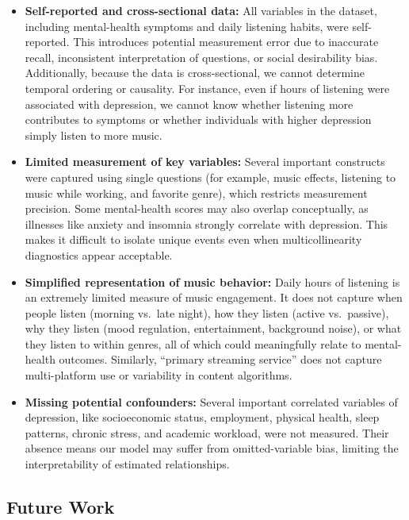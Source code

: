 \documentclass[
  letterpaper,
  DIV=11,
  numbers=noendperiod]{scrartcl}
\begin{document}
\begin{itemize}
\item
  \textbf{Self-reported and cross-sectional data:} All variables in the
  dataset, including mental-health symptoms and daily listening habits,
  were self-reported. This introduces potential measurement error due to
  inaccurate recall, inconsistent interpretation of questions, or social
  desirability bias. Additionally, because the data is cross-sectional,
  we cannot determine temporal ordering or causality. For instance, even
  if hours of listening were associated with depression, we cannot know
  whether listening more contributes to symptoms or whether individuals
  with higher depression simply listen to more music.
\item
  \textbf{Limited measurement of key variables:} Several important
  constructs were captured using single questions (for example, music
  effects, listening to music while working, and favorite genre), which
  restricts measurement precision. Some mental-health scores may also
  overlap conceptually, as illnesses like anxiety and insomnia strongly
  correlate with depression. This makes it difficult to isolate unique
  events even when multicollinearity diagnostics appear acceptable.
\item
  \textbf{Simplified representation of music behavior:} Daily hours of
  listening is an extremely limited measure of music engagement. It does
  not capture when people listen (morning vs.~late night), how they
  listen (active vs.~passive), why they listen (mood regulation,
  entertainment, background noise), or what they listen to within
  genres, all of which could meaningfully relate to mental-health
  outcomes. Similarly, ``primary streaming service'' does not capture
  multi-platform use or variability in content algorithms.
\item
  \textbf{Missing potential confounders:} Several important correlated
  variables of depression, like socioeconomic status, employment,
  physical health, sleep patterns, chronic stress, and academic
  workload, were not measured. Their absence means our model may suffer
  from omitted-variable bias, limiting the interpretability of estimated
  relationships.
\end{itemize}

\subsection{Future Work}\label{future-work}
\end{document}
